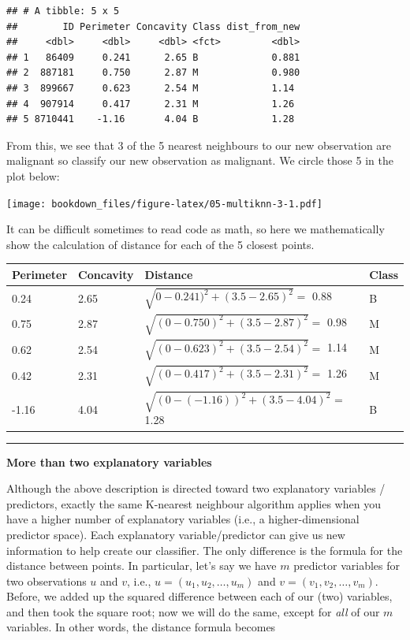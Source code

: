 \documentclass[
]{krantz}
\begin{document}
\begin{verbatim}
## # A tibble: 5 x 5
##        ID Perimeter Concavity Class dist_from_new
##     <dbl>     <dbl>     <dbl> <fct>         <dbl>
## 1   86409     0.241      2.65 B             0.881
## 2  887181     0.750      2.87 M             0.980
## 3  899667     0.623      2.54 M             1.14 
## 4  907914     0.417      2.31 M             1.26 
## 5 8710441    -1.16       4.04 B             1.28
\end{verbatim}

From this, we see that 3 of the 5 nearest neighbours to our new observation are
malignant so classify our new observation as malignant. We circle those 5 in
the plot below:

\texttt{[image: bookdown\_files/figure-latex/05-multiknn-3-1.pdf]}

It can be difficult sometimes to read code as math, so here we mathematically
show the calculation of distance for each of the 5 closest points.

\begin{longtable}[]{@{}llll@{}}
\toprule
Perimeter & Concavity & Distance & Class\tabularnewline
\midrule
\endhead
0.24 & 2.65 & \(\sqrt{0 - 0.241)^2 + (3.5 - 2.65)^2}=\) 0.88 & B\tabularnewline
0.75 & 2.87 & \(\sqrt{(0 - 0.750)^2 + (3.5 - 2.87)^2} =\) 0.98 & M\tabularnewline
0.62 & 2.54 & \(\sqrt{(0 - 0.623)^2 + (3.5 - 2.54)^2} =\) 1.14 & M\tabularnewline
0.42 & 2.31 & \(\sqrt{(0 - 0.417)^2 + (3.5 - 2.31)^2} =\) 1.26 & M\tabularnewline
-1.16 & 4.04 & \(\sqrt{(0 - (-1.16))^2 + (3.5 - 4.04)^2} =\) 1.28 & B\tabularnewline
\bottomrule
\end{longtable}

\begin{center}\rule{0.5\linewidth}{0.5pt}\end{center}

\textbf{More than two explanatory variables}

Although the above description is directed toward two explanatory variables /
predictors, exactly the same K-nearest neighbour algorithm applies when you
have a higher number of explanatory variables (i.e., a higher-dimensional
predictor space). Each explanatory variable/predictor can give us new
information to help create our classifier. The only difference is the formula
for the distance between points. In particular, let's say we have \(m\) predictor
variables for two observations \(u\) and \(v\), i.e.,
\(u = (u_{1}, u_{2}, \dots, u_{m})\) and
\(v = (v_{1}, v_{2}, \dots, v_{m})\).
Before, we added up the squared difference between each of our (two) variables,
and then took the square root; now we will do the same, except for \emph{all} of our
\(m\) variables. In other words, the distance formula becomes
\end{document}
